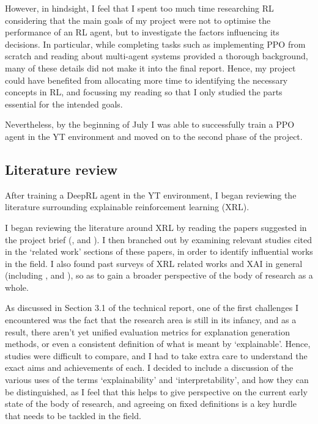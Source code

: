 \documentclass{article}
\begin{document}
However, in hindsight, I feel that I spent too much time researching RL considering that the main goals of my project were not to optimise the performance of an RL agent, but to investigate the factors influencing its decisions. In particular, while completing tasks such as implementing PPO from scratch and reading about multi-agent systems provided a thorough background, many of these details did not make it into the final report. Hence, my project could have benefited from allocating more time to identifying the necessary concepts in RL, and focussing my reading so that I only studied the parts essential for the intended goals. 

Nevertheless, by the beginning of July I was able to successfully train a PPO agent in the YT environment and moved on to the second phase of the project. 

\subsection{Literature review}
After training a DeepRL agent in the YT environment, I began reviewing the literature surrounding explainable reinforcement learning (XRL).

I began reviewing the literature around XRL by reading the papers suggested in the project brief (\cite{madumal2020explainable}, \cite{inproceedings} and \cite{wang2022causal}). I then branched out by examining relevant studies cited in the `related work' sections of these papers, in order to identify influential works in the field. I also found past surveys of XRL related works and XAI in general (including \cite{glanois2021survey}, \cite{heuillet2021explainability} and \cite{wells2021explainable}), so as to gain a broader perspective of the body of research as a whole.

As discussed in Section 3.1 of the technical report, one of the first challenges I encountered was the fact that the research area is still in its infancy, and as a result, there aren't yet unified evaluation metrics for explanation generation methods, or even a consistent definition of what is meant by `explainable'. Hence, studies were difficult to compare, and I had to take extra care to understand the exact aims and achievements of each. I decided to include a discussion of the various uses of the terms `explainability' and `interpretability', and how they can be distinguished, as I feel that this helps to give perspective on the current early state of the body of research, and agreeing on fixed definitions is a key hurdle that needs to be tackled in the field. 
\end{document}
